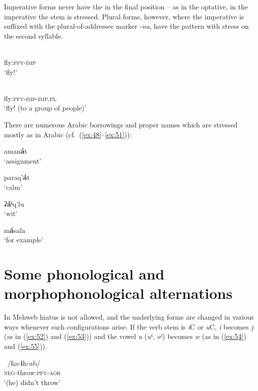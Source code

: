 \documentclass[output=paper]{langsci/langscibook}
\begin{document}
Imperative forms never have the  in the final position – as in
the optative, in the imperative the stem is stressed. Plural forms,
however, where the imperative is suffixed with the plural-of-addressee
marker \emph{-na}, have the pattern with stress on the second syllable.

\ea \label{ex:46} %
\\
fly:\textsc{pfv}-\textsc{imp}\\
\glt `fly!'

\ex \label{ex:47} %
\\
fly:\textsc{pfv}-\textsc{imp}-\textsc{imp}.\textsc{pl}\\
\glt `fly! (to a group of people)'
\z 

There are numerous Arabic borrowings and proper names which are stressed
mostly as in Arabic (cf.\ (\ref{ex:48}–\ref{ex:51})):

\ea \label{ex:48} %
{aman\textbf{á}t}\\
\glt `assignment'

\ex %
{paraq'\textbf{á}t}\\
\glt `calm'

\ex %
{ʡ\textbf{áˤ}q'lu}\\
\glt `wit'

\ex \label{ex:51} %
{m\textbf{á}sala}\\
\glt `for example'
\z



\section{Some phonological and morphophonological alternations}\label{some-phonological-and-morphophonological-alternations}


In Mehweb hiatus is not allowed, and the underlying forms are changed in
various ways whenever such configurations arise. If the verb stem is
\emph{i}C or \emph{u}C, \emph{i} becomes \emph{j} (as in (\ref{ex:52}) and (\ref{ex:53}))
and the vowel \emph{u} (\emph{uˤ}, \emph{oˤ}) becomes \emph{w} (as in (\ref{ex:54})
and (\ref{ex:55})).

\ea \label{ex:52} %
~/{ħa-\textbf{i}h-ub}/\\
\textsc{neg}-throw:\textsc{pfv}-\textsc{aor}\\
\glt `(he) didn't throw'
\end{document}
